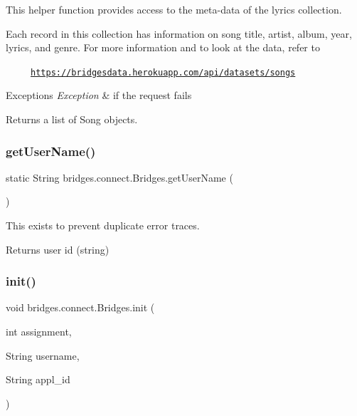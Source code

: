 This helper function provides access to the meta-\/data of the lyrics collection.

Each record in this collection has information on song title, artist, album, year, lyrics, and genre. For more information and to look at the data, refer to 

~~~~~\href{https://bridgesdata.herokuapp.com/api/datasets/songs}{\tt https\+://bridgesdata.\+herokuapp.\+com/api/datasets/songs} 


\begin{DoxyExceptions}{Exceptions}
{\em Exception} & if the request fails\\
\hline
\end{DoxyExceptions}
\begin{DoxyReturn}{Returns}
a list of Song objects. 
\end{DoxyReturn}
\mbox{\label{classbridges_1_1connect_1_1_bridges_a75f047cda3100e0cfa88378293c12961}} 
\subsubsection{\texorpdfstring{get\+User\+Name()}{getUserName()}}
{\footnotesize\ttfamily static String bridges.\+connect.\+Bridges.\+get\+User\+Name (\begin{DoxyParamCaption}{ }\end{DoxyParamCaption})\hspace{0.3cm}{\ttfamily [static]}}

This exists to prevent duplicate error traces.

\begin{DoxyReturn}{Returns}
user id (string) 
\end{DoxyReturn}
\mbox{\label{classbridges_1_1connect_1_1_bridges_a87aa73367a43cfc8b3ae5e4926ea4895}} 
\subsubsection{\texorpdfstring{init()}{init()}}
{\footnotesize\ttfamily void bridges.\+connect.\+Bridges.\+init (\begin{DoxyParamCaption}\item[{int}]{assignment,  }\item[{String}]{username,  }\item[{String}]{appl\+\_\+id }\end{DoxyParamCaption})}

